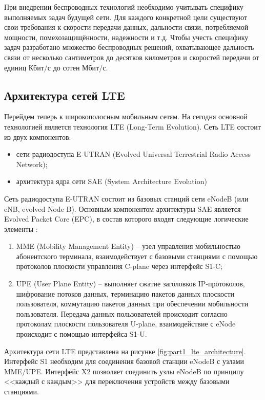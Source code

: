 При внедрении беспроводных технологий необходимо учитывать специфику выполняемых задач будущей сети. Для каждого конкретной цели существуют свои требования к скорости передачи данных, дальности связи, потребляемой мощности, помехозащищённости, надежности и т.д. Чтобы учесть специфику задач разработано множество беспроводных решений, охватывающее дальность связи от несколько сантиметров до десятков километров и скоростей передачи от единиц Кбит/с до сотен Мбит/с.

\subsection{Архитектура сетей LTE}

Перейдем теперь к широкополосным мобильным сетям. На сегодня основной технологией является технология LTE (Long-Term Evolution). Сеть LTE состоит из двух компонентов:
\begin{itemize}
    \item сети радиодоступа E-UTRAN (Evolved Universal Terrestrial Radio Access Network);
    \item архитектура ядра сети SAE (System Architecture Evolution)
\end{itemize}
Сеть радиодоступа E-UTRAN состоит из базовых станций сети eNodeB (или eNB, evolved Node B).
Основным компонентом архитектуры SAE является Evolved Packet Core (EPC), в состав которого входят следующие логические элементы \cite{Tikhvinsky2014}:

\begin{enumerate}
  \item MME (Mobility Management Entity) -- узел управления мобильностью абонентского терминала, взаимодействует с базовыми станциями с помощью протоколов плоскости управления C-plane через интерфейс S1-C;
  \item UPE (User Plane Entity) -- выполняет сжатие заголовков IP-протоколов, шифрование потоков данных, терминацию пакетов данных плоскости пользователя, коммутацию пакетов данных при обеспечении мобильности пользователя. Передача данных пользователей происходит согласно протоколам плоскости пользователя U-plane, взаимодействие с eNode происходит с помощью интерфейса S1-U.
\end{enumerate}

Архитектура сети LTE представлена на рисунке \cref{fig:part1_lte_architecture}. Интерфейс S1 необходим для соединения базовой станции eNodeB с узлами MME/UPE.  Интерфейс X2 позволяет соединить узлы eNodeB по принципу <<каждый с каждым>> для переключения устройств между базовыми станциями. 

